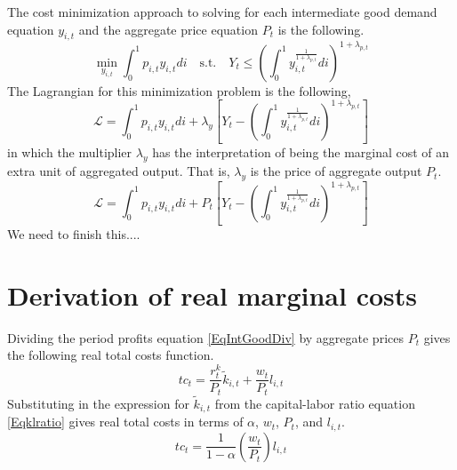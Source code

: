 \documentclass[article,11pt,letterpaper,fleqn]{article}
\theoremstyle{definition}
\numberwithin{equation}{section}
\begin{document}
The cost minimization approach to solving for each intermediate good demand equation $y_{i,t}$ and the aggregate price equation $P_t$ is the following.
\begin{equation}\label{TAppEqObjCostMin}
   \min_{y_{i,t}} \int_{0}^{1}p_{i,t}y_{i,t}di \quad\text{s.t.}\quad Y_t \leq \left(\int_{0}^{1} y_{i,t}^{\frac{1}{1+\lambda_{p,t}}}di\right)^{1+\lambda_{p,t}}
\end{equation}
The Lagrangian for this minimization problem is the following,
\begin{equation}\label{TAppEqLagrCostMin}
   \mathcal{L} = \int_{0}^{1}p_{i,t}y_{i,t}di + \lambda_y\left[Y_t - \left(\int_{0}^{1} y_{i,t}^{\frac{1}{1+\lambda_{p,t}}}di\right)^{1+\lambda_{p,t}}\right]
\end{equation}
in which the multiplier $\lambda_y$ has the interpretation of being the marginal cost of an extra unit of aggregated output. That is, $\lambda_y$ is the price of aggregate output $P_t$.
\begin{equation}\label{TAppEqLagrCostMin2}
   \mathcal{L} = \int_{0}^{1}p_{i,t}y_{i,t}di + P_t\left[Y_t - \left(\int_{0}^{1} y_{i,t}^{\frac{1}{1+\lambda_{p,t}}}di\right)^{1+\lambda_{p,t}}\right]
\end{equation}
We need to finish this....


\newpage
\setcounter{equation}{0} %
\section{Derivation of real marginal costs}\label{TAppRealMC}

Dividing the period profits equation \eqref{EqIntGoodDiv} by aggregate prices $P_t$ gives the following real total costs function.
\begin{equation}\label{TAppEqRealTC}
   tc_t = \frac{r_t^k}{P_t}\tilde{k}_{i,t} + \frac{w_t}{P_t}l_{i,t}
\end{equation}
Substituting in the expression for $\tilde{k}_{i,t}$ from the capital-labor ratio equation \eqref{Eqklratio} gives real total costs in terms of $\alpha$, $w_t$, $P_t$, and $l_{i,t}$.
\begin{equation}\label{TAppEqRealTCl}
   tc_t = \frac{1}{1-\alpha}\left(\frac{w_t}{P_t}\right)l_{i,t}
\end{equation}
\end{document}
